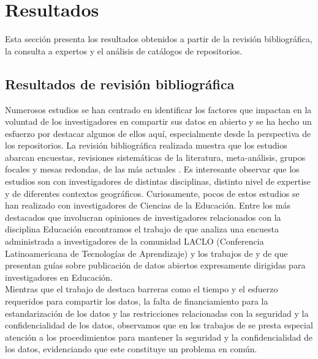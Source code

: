 \documentclass[runningheads]{llncs}
\begin{document}
\section{Resultados}

Esta sección presenta los resultados obtenidos a partir de la revisión bibliográfica, la consulta a expertos y el análisis de catálogos de repositorios.

\subsection{Resultados de revisión bibliográfica}

Numerosos estudios se han centrado en identificar los factores que impactan en la voluntad de los investigadores en compartir sus datos en abierto y se ha hecho un esfuerzo por destacar algunos de ellos aquí, especialmente desde la perspectiva de los repositorios. 
La revisión bibliográfica realizada muestra que los estudios abarcan encuestas, revisiones sistemáticas de la literatura, meta-análisis, grupos focales y mesas redondas, de las más actuales \citep{tenopir2011,revision2020,barczak2022,casali2022open, researchers2022,borycz2023,logan2021,researchers2024,malasya,bio-uy}. Es interesante observar que los estudios son con investigadores de distintas disciplinas, distinto nivel de expertise y de diferentes contextos geográficos. Curiosamente, pocos de estos estudios se han realizado con investigadores de Ciencias de la Educación. Entre los más destacados que involucran opiniones de investigadores relacionados con la disciplina Educación encontramos el trabajo de \citet{casali2022open} que analiza una encuesta administrada a investigadores de la comunidad LACLO (Conferencia Latinoamericana de Tecnologías de Aprendizaje) y los trabajos de \citet{logan2021} y de \citet{guia} 
que presentan guías sobre publicación de datos abiertos expresamente dirigidas para investigadores en Educación.\\

Mientras que el trabajo de \citet{casali2022open} destaca barreras como el tiempo y el esfuerzo requeridos para compartir los datos, la falta de financiamiento para la estandarización de los datos y las restricciones relacionadas con la seguridad y la confidencialidad de los datos, observamos que en los trabajos de \citet{logan2021, guia} se presta especial atención a los procedimientos para mantener la seguridad y la confidencialidad de los datos, evidenciando que este constituye un problema en común.\\
\end{document}
